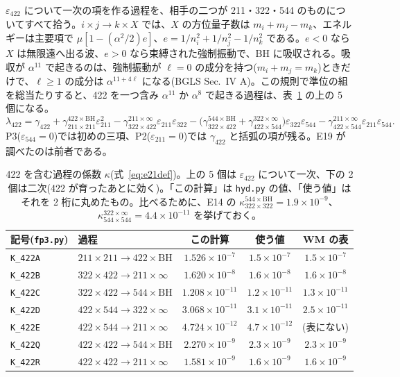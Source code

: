 $\varepsilon_{422}$ について一次の項を作る過程を、相手の二つが 211・322・544 のものについてすべて拾う。$i\times j\to k\times X$ では、$X$ の方位量子数は $m_i+m_j-m_k$、エネルギーは主要項で $\mu[1-(\alpha^2/2)e]$、$e=1/n_i^2+1/n_j^2-1/n_k^2$ である。$e<0$ なら $X$ は無限遠へ出る波、$e>0$ なら束縛された強制振動で、BH に吸収される。吸収が $\alpha^{11}$ で起きるのは、強制振動が $\ell=0$ の成分を持つ($m_i+m_j=m_k$)ときだけで、$\ell\ge1$ の成分は $\alpha^{11+4\ell}$ になる(BGLS Sec.~IV A)。この規則で準位の組を総当たりすると、422 を一つ含み $\alpha^{11}$ か $\alpha^{8}$ で起きる過程は、表~\ref{tab:e21rates} の上の 5 個になる。
\begin{equation}
\lambda_{422}=\gamma_{422}+\gamma^{422\times\mathrm{BH}}_{211\times211}\varepsilon_{211}^2-\gamma^{211\times\infty}_{322\times422}\varepsilon_{211}\varepsilon_{322}
-\bigl(\gamma^{544\times\mathrm{BH}}_{322\times422}+\gamma^{322\times\infty}_{422\times544}\bigr)\varepsilon_{322}\varepsilon_{544}-\gamma^{211\times\infty}_{422\times544}\varepsilon_{211}\varepsilon_{544}.
\label{eq:e21lam}
\end{equation}
P3($\varepsilon_{544}=0$)では初めの三項、P2($\varepsilon_{211}=0$)では $\gamma_{422}$ と括弧の項が残る。E19 が調べたのは前者である。

\begin{table}[H]
\centering\small
\begin{tabular}{llccc}
\toprule
記号(\texttt{fp3.py}) & 過程 & この計算 & 使う値 & WM の表\\
\midrule
\texttt{K\_422A} & $211\times211\to422\times\mathrm{BH}$ & $1.526\times10^{-7}$ & $1.5\times10^{-7}$ & $1.5\times10^{-7}$\\
\texttt{K\_422B} & $322\times422\to211\times\infty$ & $1.620\times10^{-8}$ & $1.6\times10^{-8}$ & $1.6\times10^{-8}$\\
\texttt{K\_422C} & $322\times422\to544\times\mathrm{BH}$ & $1.208\times10^{-11}$ & $1.2\times10^{-11}$ & $1.3\times10^{-11}$\\
\texttt{K\_422D} & $422\times544\to322\times\infty$ & $3.068\times10^{-11}$ & $3.1\times10^{-11}$ & $2.5\times10^{-11}$\\
\texttt{K\_422E} & $422\times544\to211\times\infty$ & $4.724\times10^{-12}$ & $4.7\times10^{-12}$ & (表にない)\\
\midrule
\texttt{K\_422Q} & $422\times422\to544\times\mathrm{BH}$ & $2.270\times10^{-9}$ & $2.3\times10^{-9}$ & $2.3\times10^{-9}$\\
\texttt{K\_422R} & $422\times422\to211\times\infty$ & $1.581\times10^{-9}$ & $1.6\times10^{-9}$ & $1.6\times10^{-9}$\\
\bottomrule
\end{tabular}
\caption{422 を含む過程の係数 $\kappa$(式~\eqref{eq:e21def})。上の 5 個は $\varepsilon_{422}$ について一次、下の 2 個は二次(422 が育ったあとに効く)。「この計算」は \texttt{hyd.py} の値、「使う値」はそれを 2 桁に丸めたもの。比べるために、E14 の $\kappa^{544\times\mathrm{BH}}_{322\times322}=1.9\times10^{-9}$、$\kappa^{322\times\infty}_{544\times544}=4.4\times10^{-11}$ を挙げておく。}
\label{tab:e21rates}
\end{table}

